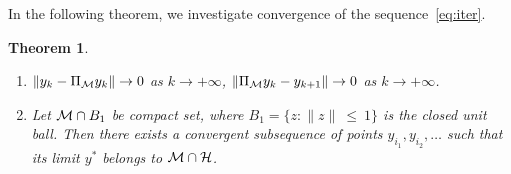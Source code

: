\documentclass[sii]{ipart}
\newtheorem{theorem}{Theorem}
\begin{document}
In the following theorem, we investigate convergence of the sequence~\eqref{eq:iter}.

\begin{theorem}
	\label{th:converg}
	\begin{enumerate}
		Let the conditions of Proposition~\ref{prop:pythaprop} be fulfilled and also the set $\calM$ and the space $\calH$ be closed under the limit operation. Then
		\item $\|y_k - \Pi_{\mathcal{M}}y_k\| \to 0$ as $k \to +\infty$, $\|\Pi_{\mathcal{M}}y_k - y_{k+1}\| \to 0$ as $k \to +\infty$.
		\item Let $\mathcal{M} \cap B_1$ be compact set, where $B_1=\{z: \|z\|~\le~1\}$ is the closed unit ball. Then there exists a convergent subsequence of points $y_{i_1}, y_{i_2}, \ldots$ such that its limit $y^*$ belongs to $\mathcal{M} \cap \mathcal{H}$.
	\end{enumerate}
\end{theorem}
\end{document}

